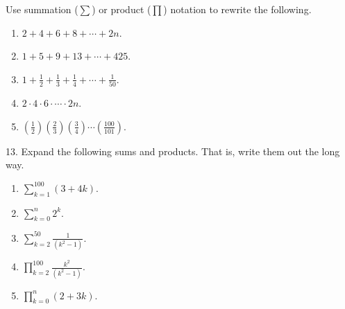 \documentclass[10pt,]{book}
\theoremstyle{plain}
\theoremstyle{definition}
\theoremstyle{definition}
\theoremstyle{definition}
\theoremstyle{definition}
\numberwithin{equation}{chapter}
\renewcommand{\d}{\displaystyle}
\begin{document}
\begin{exerciselist}
Use summation (\(\sum\)) or product (\(\prod\)) notation to rewrite the following.%
\par
\hypertarget{p-224}{}%
\leavevmode%
\begin{enumerate}[label=(\alph*)]
\item\hypertarget{li-133}{}\(2 + 4 + 6 + 8 + \cdots + 2n\).%
\item\hypertarget{li-134}{}\(1 + 5 + 9 + 13 + \cdots + 425\).%
\item\hypertarget{li-135}{}\(1 + \frac{1}{2} + \frac{1}{3} + \frac{1}{4} + \cdots + \frac{1}{50}\).%
\item\hypertarget{li-136}{}\(2 \cdot 4 \cdot 6 \cdot \cdots \cdot 2n\).%
\item\hypertarget{li-137}{}\((\frac{1}{2})(\frac{2}{3})(\frac{3}{4})\cdots(\frac{100}{101})\).%
\end{enumerate}
%
\par\smallskip
\item[13.]\hypertarget{exercise-22}{}\hypertarget{p-226}{}%
Expand the following sums and products. That is, write them out the long way.%
\par
\hypertarget{p-227}{}%
\leavevmode%
\begin{enumerate}[label=(\alph*)]
\item\hypertarget{li-143}{}\(\d\sum_{k=1}^{100} (3+4k)\).%
\item\hypertarget{li-144}{}\(\d\sum_{k=0}^n 2^k\).%
\item\hypertarget{li-145}{}\(\d\sum_{k=2}^{50}\frac{1}{(k^2 - 1)}\).%
\item\hypertarget{li-146}{}\(\d\prod_{k=2}^{100}\frac{k^2}{(k^2-1)}\).%
\item\hypertarget{li-147}{}\(\d\prod_{k=0}^n (2+3k)\).%
\end{enumerate}
%
\par\smallskip
\end{exerciselist}
\typeout{************************************************}
\typeout{************************************************}
\end{document}
